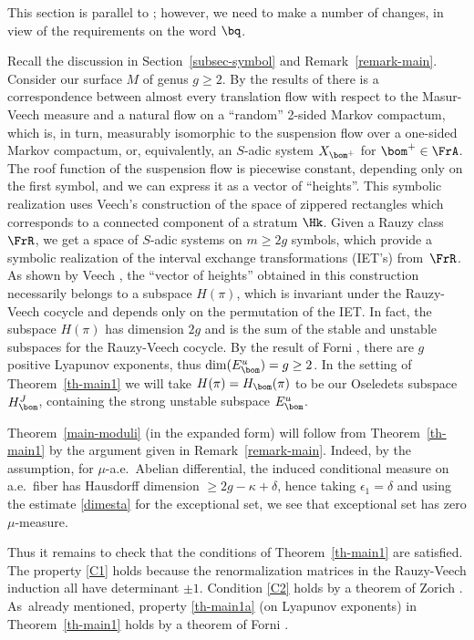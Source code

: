 This section is parallel to \cite[\S11]{BuSo18a}; however, we need to make a number of changes, in view of the requirements on the word $\bq$.

Recall the discussion in Section~\ref{subsec-symbol} and Remark~\ref{remark-main}.
Consider our surface $M$ of genus $g\ge 2$. By the results of \cite[\S4]{Buf-umn} there is a correspondence between almost every translation flow with respect to the Masur-Veech measure and a natural flow on a ``random'' 2-sided Markov compactum, which is, in turn, measurably isomorphic to the suspension flow over a one-sided Markov compactum, or, equivalently, an $S$-adic system $X_{\bom^+}$ for $\bom^+\in \FrA$. The roof function of the suspension flow is piecewise constant, depending only on the first symbol, and we can express it as a vector of ``heights''. This symbolic realization uses Veech's construction \cite{veech} of the space of zippered rectangles which corresponds to a connected component of a stratum $\Hk$. Given a Rauzy class~$\FrR$, we get a space of $S$-adic systems on $m\ge 2g$ symbols, which provide a symbolic realization of the interval exchange transformations (IET's) from~$\FrR$. As shown by Veech \cite{veechamj}, the ``vector of heights'' obtained in this construction necessarily belongs to a subspace $H(\pi)$, which is invariant under the Rauzy-Veech cocycle and depends only on the permutation of the IET. In fact, the subspace $H(\pi)$ has dimension $2g$ and is the sum of the stable and unstable subspaces for the Rauzy-Veech cocycle. By the result of Forni \cite{Forni}, there are $g$ positive Lyapunov exponents, thus $\dim(E^u_\bom)=g\ge 2$. In the setting of Theorem~\ref{th-main1} we will take $H(\pi) = H_\bom(\pi)$ to be our Oseledets subspace~$H^J_\bom$, containing the strong unstable subspace $E^u_\bom$.

Theorem~\ref{main-moduli} (in the expanded form) will follow from Theorem~\ref{th-main1} by the argument given in Remark~\ref{remark-main}. Indeed, by the assumption, for $\mu$-a.e.\ Abelian differential, the induced conditional measure on a.e.\ fiber has Hausdorff dimension $\ge 2g-\kappa + \delta$, hence taking $\epsilon_1=\delta$ and using the estimate \eqref{dimesta} for the exceptional set, we see that exceptional set has zero $\mu$-measure.

Thus it remains to check that the conditions of Theorem~\ref{th-main1} are satisfied. The property \eqref{C1} holds because the renormalization matrices in the Rauzy-Veech induction all have determinant $\pm 1$. Condition \eqref{C2} holds by a theorem of Zorich \cite{Zorich}. As~already mentioned, property \eqref{th-main1a} (on Lyapunov exponents) in Theorem~\ref{th-main1} holds by a theorem of Forni \cite{Forni}.

